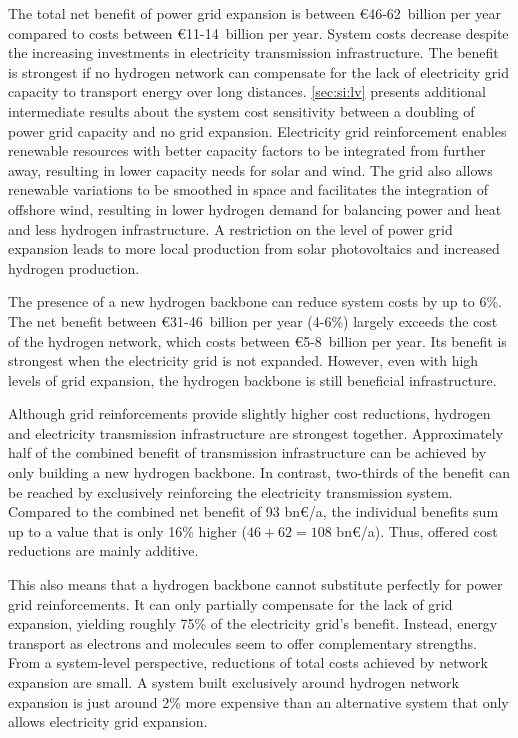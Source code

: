 The total net benefit of power grid expansion is between \euro46-62~billion per
year compared to costs between \euro11-14~billion per year. System costs
decrease despite the increasing investments in electricity transmission
infrastructure. The benefit is strongest if no hydrogen network can compensate
for the lack of electricity grid capacity to transport energy over long
distances. \cref{sec:si:lv} presents additional intermediate results about the
system cost sensitivity between a doubling of power grid capacity and no grid
expansion. Electricity grid reinforcement enables renewable resources with
better capacity factors to be integrated from further away, resulting in lower
capacity needs for solar and wind. The grid also allows renewable variations to
be smoothed in space and facilitates the integration of offshore wind, resulting
in lower hydrogen demand for balancing power and heat and less hydrogen
infrastructure. A restriction on the level of power grid expansion leads to more
local production from solar photovoltaics and increased hydrogen production.

The presence of a new hydrogen backbone can reduce system costs by up to 6\%.
The net benefit between \euro31-46~billion per year (4-6\%) largely exceeds the
cost of the hydrogen network, which costs between \euro5-8~billion per year. Its
benefit is strongest when the electricity grid is not expanded. However, even
with high levels of grid expansion, the hydrogen backbone is still beneficial
infrastructure.

Although grid reinforcements provide slightly higher cost reductions, hydrogen and
electricity transmission infrastructure are strongest together. Approximately
half of the combined benefit of transmission infrastructure can be achieved by
only building a new hydrogen backbone. In contrast, two-thirds of the benefit
can be reached by exclusively reinforcing the electricity transmission system.
Compared to the combined net benefit of 93 bn\euro/a, the individual benefits
sum up to a value that is only 16\% higher ($46+62=108$ bn\euro/a). Thus,
offered cost reductions are mainly additive.

This also means that a hydrogen backbone cannot substitute perfectly for power
grid reinforcements. It can only partially compensate for the lack of grid
expansion, yielding roughly 75\% of the electricity grid's benefit. Instead,
energy transport as electrons and molecules seem to offer complementary
strengths. From a system-level perspective, reductions of total costs achieved
by network expansion are small. A system built exclusively around hydrogen
network expansion is just around 2\% more expensive than an alternative system
that only allows electricity grid expansion. %

